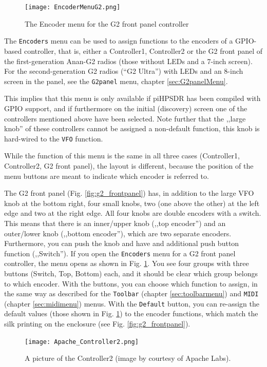 \documentclass[12pt]{book}
\def\rett#1{\texttt{\color{red}#1}}
\def\bltt#1{\texttt{\color{blue}#1}}
\def\pH{pi\-HPSDR\xspace}
\begin{document}
\begin{figure}[ht]
\center
\texttt{[image: EncoderMenuG2.png]}
\caption{The Encoder menu for the G2 front panel controller}
\label{fig:EncoderMenuG2}
\end{figure}
The \bltt{Encoders} menu can be used to assign functions to the encoders of a
GPIO-based controller, that is, either a
Controller1, Controller2 or the G2 front panel of the first-generation Anan-G2 radios
(those without LEDs and a 7-inch screen). For the second-generation G2 radios
(``G2 Ultra'') with LEDs and an 8-inch screen in the panel, see the \bltt{G2panel}
menu, chapter \ref{sec:G2panelMenu}.

This implies that this menu is only available if \pH has been compiled with GPIO support,
and if furthermore on the initial (discovery) screen one of the controllers mentioned above have
been selected. Note further that the ,,large knob'' of these controllers
cannot be assigned a non-default function, this knob is hard-wired to the \bltt{VFO} function.


While the function of this menu is the same in all three cases (Controller1, Controller2,
G2 front panel), the layout is different, because the position of the menu buttons
are meant to indicate which encoder is referred to.



The G2 front panel (Fig. \ref{fig:g2_frontpanel}) has,
in addition to the large VFO knob at the bottom right,
four small knobs, two (one above the other)
at the left edge and two at the right edge. All four knobs are double encoders with
a switch. This means that there is an inner/upper knob (,,top encoder'')
and an outer/lower knob (,,bottom encoder''), which
are two separate encoders. Furthermore, you can push the knob and have and additional
push button function (,,Switch''). If you open the \bltt{Encoders} menu for
a G2 front panel controller, the menu opens as shown in Fig. \ref{fig:EncoderMenuG2}.
You see four groups with three buttons (Switch, Top, Bottom) each, and it should be
clear which group belongs to which encoder. With the buttons, you can choose which function
to assign, in the same way as described for the \bltt{Toolbar} (chapter \ref{sec:toolbarmenu})
and \bltt{MIDI} (chapter \ref{sec:midimenu}) menus. With the \rett{Default} button, you can
re-assign the default values (those shown in Fig. \ref{fig:EncoderMenuG2})
to the encoder functions, which match the silk printing
on the enclosure (see Fig. \ref{fig:g2_frontpanel}).

\begin{figure}[ht!]
\center
\texttt{[image: Apache\_Controller2.png]}
\caption{A picture of the Controller2 (image by courtesy of Apache Labs).}
\label{fig:Apache_Controller2}
\end{figure}
\end{document}
